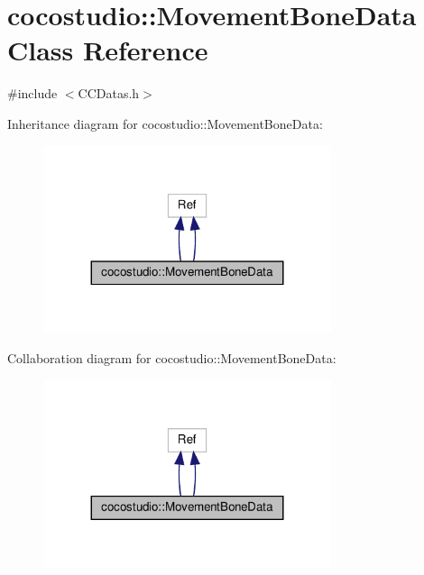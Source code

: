 \hypertarget{classcocostudio_1_1MovementBoneData}{}\section{cocostudio\+:\+:Movement\+Bone\+Data Class Reference}
\label{classcocostudio_1_1MovementBoneData}


{\ttfamily \#include $<$C\+C\+Datas.\+h$>$}



Inheritance diagram for cocostudio\+:\+:Movement\+Bone\+Data\+:
\nopagebreak
\begin{figure}[H]
\begin{center}
\leavevmode
\includegraphics[width=239pt]{classcocostudio_1_1MovementBoneData__inherit__graph}
\end{center}
\end{figure}


Collaboration diagram for cocostudio\+:\+:Movement\+Bone\+Data\+:
\nopagebreak
\begin{figure}[H]
\begin{center}
\leavevmode
\includegraphics[width=239pt]{classcocostudio_1_1MovementBoneData__coll__graph}
\end{center}
\end{figure}
